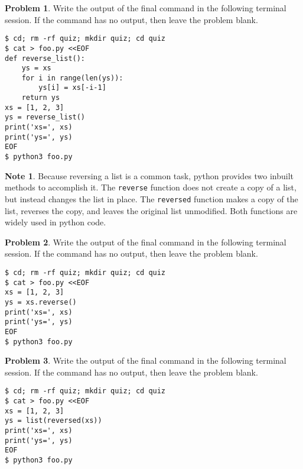 \documentclass[10pt]{article}
\theoremstyle{definition}
\newtheorem{problem}{Problem}
\newtheorem{note}{Note}
\begin{document}
\filbreak
\begin{problem}
    Write the output of the final command in the following terminal session.
    If the command has no output, then leave the problem blank.
\end{problem}
\begin{lstlisting}
$ cd; rm -rf quiz; mkdir quiz; cd quiz
$ cat > foo.py <<EOF
def reverse_list():
    ys = xs
    for i in range(len(ys)):
        ys[i] = xs[-i-1]
    return ys
xs = [1, 2, 3]
ys = reverse_list()
print('xs=', xs)
print('ys=', ys)
EOF
$ python3 foo.py
\end{lstlisting}

\begin{note}
Because reversing a list is a common task,
python provides two inbuilt methods to accomplish it.
The \texttt{reverse} function does not create a copy of a list, but instead changes the list in place.
The \texttt{reversed} function makes a copy of the list, reverses the copy, and leaves the original list unmodified.
Both functions are widely used in python code.
\end{note}

\filbreak
\begin{problem}
    Write the output of the final command in the following terminal session.
    If the command has no output, then leave the problem blank.
\end{problem}
\begin{lstlisting}
$ cd; rm -rf quiz; mkdir quiz; cd quiz
$ cat > foo.py <<EOF
xs = [1, 2, 3]
ys = xs.reverse()
print('xs=', xs)
print('ys=', ys)
EOF
$ python3 foo.py
\end{lstlisting}


\filbreak
\begin{problem}
    Write the output of the final command in the following terminal session.
    If the command has no output, then leave the problem blank.
\end{problem}
\begin{lstlisting}
$ cd; rm -rf quiz; mkdir quiz; cd quiz
$ cat > foo.py <<EOF
xs = [1, 2, 3]
ys = list(reversed(xs))
print('xs=', xs)
print('ys=', ys)
EOF
$ python3 foo.py
\end{lstlisting}
\end{document}

